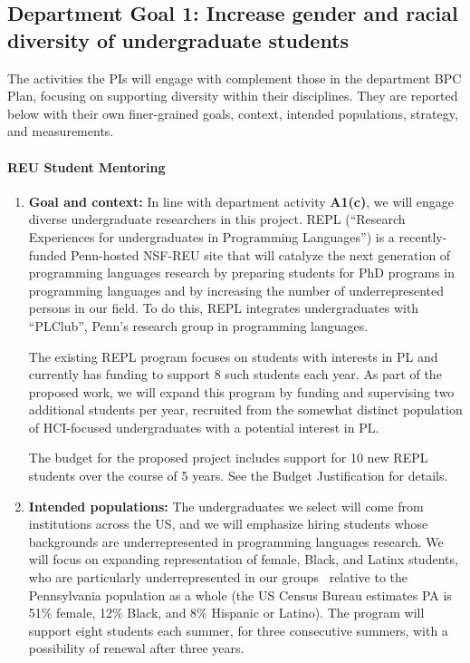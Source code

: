 \subsection*{Department Goal 1: Increase gender and racial diversity of undergraduate
students}

The activities the PIs will engage with complement those in the department BPC
Plan, focusing on supporting diversity within their disciplines. They are
reported below with their own finer-grained goals, context, intended
populations, strategy, and measurements.

\paragraph*{REU Student Mentoring}

\begin{enumerate}
\item {\bf Goal and context:} In line with department activity \textbf{A1(c)},
we will engage diverse undergraduate researchers in this project.
REPL (``Research Experiences for
undergraduates in Programming Languages'') is a recently-funded
Penn-hosted NSF-REU site that will catalyze the next generation of
programming languages research by preparing students for PhD programs
in programming languages and by increasing the number of
underrepresented persons in our field. To do this, REPL integrates
undergraduates with ``PLClub'', Penn’s research group in programming
languages.

The existing REPL program focuses on students with interests in PL and
currently has funding to support 8 such students each year.  As part
of the proposed work, we will expand this program by funding and
supervising two additional students per year, recruited from the
somewhat distinct population of HCI-focused undergraduates with a
potential interest in PL.

The budget for the proposed project includes support for 10 new REPL
students over the course of 5 years.  See the Budget Justification for
details.

\item {\bf Intended populations:} The undergraduates we select will
come from institutions across the US, and we will emphasize hiring
students whose backgrounds are underrepresented in programming
languages research.
%
%
We will focus on expanding representation of
female, Black, and Latinx students, who are particularly
underrepresented in our
groups~\cite{taulbee2019} relative to the Pennsylvania population as a
whole (the US Census Bureau
estimates PA is 51\% female, 12\% Black, and 8\% Hispanic or Latino).  The
program will support eight students  each
summer, for three consecutive summers, with a possibility of renewal
after three years.


\end{enumerate}
